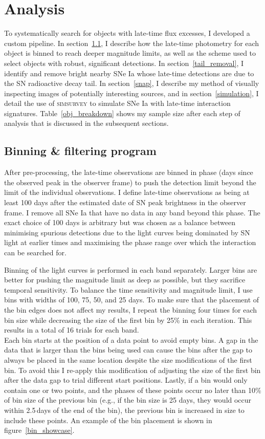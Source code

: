 \documentclass[a4paper,oneside,12pt, class=Latex/Classes/PhDthesisPSnPDF, crop=false]{standalone}
\begin{document}
\section{Analysis}
\label{DR2_analysis}
To systematically search for objects with late-time flux excesses, I developed a custom pipeline. In section~\ref{pipeline}, I describe how the late-time photometry for each object is binned to reach deeper magnitude limits, as well as the scheme used to select objects with robust, significant detections. In section~\ref{tail_removal}, I identify and remove bright nearby SNe Ia whose late-time detections are due to the SN radioactive decay tail. In section~\ref{snap}, I describe my method of visually inspecting images of potentially interesting sources, and in section~\ref{simulation}, I detail the use of \textsc{simsurvey} to simulate SNe Ia with late-time interaction signatures. Table~\ref{obj_breakdown} shows my sample size after each step of analysis that is discussed in the subsequent sections.


\subsection{Binning \& filtering program}
\label{pipeline}
After pre-processing, the late-time observations are binned in phase (days since the observed peak in the observer frame) to push the detection limit beyond the limit of the individual observations. I define late-time observations as being at least 100 days after the estimated date of SN peak brightness in the observer frame. I remove all SNe Ia that have no data in any band beyond this phase. The exact choice of 100 days is arbitrary but was chosen as a balance between minimising spurious detections due to the light curves being dominated by SN light at earlier times and maximising the phase range over which the interaction can be searched for.

Binning of the light curves is performed in each band separately. Larger bins are better for pushing the magnitude limit as deep as possible, but they sacrifice temporal sensitivity. To balance the time sensitivity and magnitude limit, I use bins with widths of 100, 75, 50, and 25 days. To make sure that the placement of the bin edges does not affect my results, I repeat the binning four times for each bin size while decreasing the size of the first bin by 25\% in each iteration. This results in a total of 16 trials for each band.\\

Each bin starts at the position of a data point to avoid empty bins. A gap in the data that is larger than the bins being used can cause the bins after the gap to always be placed in the same location despite the size modifications of the first bin. To avoid this I re-apply this modification of adjusting the size of the first bin after the data gap to trial different start positions. Lastly, if a bin would only contain one or two points, and the phases of these points occur no later than 10\% of bin size of the previous bin (e.g., if the bin size is 25 days, they would occur within 2.5\,days of the end of the bin), the previous bin is increased in size to include these points. An example of the bin placement is shown in figure~\ref{bin_showcase}.
\end{document}
